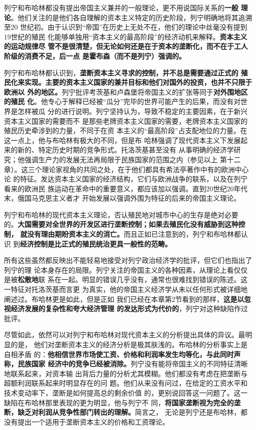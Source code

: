列宁和布哈林都没有提出帝国主义兼并的一般理论，更不用说国际关系的\textbf{一般
理论}。他们关注的是他们各自理解的资本主义特定的历史阶段，列宁明确地将其追溯至20
世纪初。由于认识到“帝国”在历史上无处不在，他们的理论中丝毫没有提到19世纪的殖民
化能够单独用“资本主义的最高阶段”的经济动机来解释。\textbf{资本主义的运动规律尽
管不是很清楚，但无论如何还是在于资本的垄断化，而不在于工人阶级的消费不足，后一点
是霍布森（而不是列宁）强调的。}

列宁和布哈林都认识到，\textbf{垄断资本主义寻求的控制，并不总是需要通过正式的
殖民化来实现。主要的资本主义国家的兼并目标和他们对国外的投资，也并不只限于欧洲以
外的地区。}列宁批评考茨基和卢森堡将帝国主义的扩张等同于\textbf{对外围地区的殖民
化}。他专心于解释已经被“瓜分”完毕的世界可能产生的后果，而没有对世界是怎样被瓜
分的进行说明。列宁坚持认为，导致不稳定的主要因素，在于新兴资本主义国家的需要而不
是那些老牌资本主义国家的需要，老牌资本主义国家的殖民历史牵涉到的力量，不同于在资
本主义的“最高阶段”占支配地位的力量。在这一点上，他与布哈林有极大的不同，但是布
哈林强调了现代资本主义下发展起来的新的、特定历史时期的竞争形式。托洛茨基甚至没有
从事明确的经济学研究；他强调生产力的发展无法再局限于民族国家的范围之内（参见以上
第十二章）。这三个理论家视角的共同之处，在于他们都具有希法亭著作中有的欧洲中心论
的特征。发达资本主义国家的经济结构，它们与欧洲战争的联系，以及在列宁看来的欧洲民
族运动在革命中的重要意义，都应该加以强调。直到20世纪20年代末，俄国马克思主义者才
开始发展以强调外围为特征的后来的帝国主义理论。

列宁和布哈林的现代资本主义理论，否认殖民地对城市中心的生存是绝对必要
的。\textbf{大国需要对全世界的开发区进行垄断控制；如果去殖民化没有威胁到这种控制，
  就没有理由期盼资本主义的消亡。}而且正如已注意到的，列宁和布哈林都认识
到\textbf{经济控制是比正式的殖民统治更具一般性的范畴。}

所有这些虽然都反映出不能轻易地接受对列宁政治经济学的批评，但它们也指出了列宁的理
论本身存在的局限。列宁关注的帝国主义的各种因素，从理论上看仅仅是被\textbf{松散地}联
系在一起。明显的错误几乎没有，通常也很难找到错误的陈述。这一特征对托洛茨基而言更
为真实，他的帝国主义经济学从未以任何形式被详细地阐述过。布哈林更是如此，但是正如
我们已经在本章第2节看到的那样，\textbf{这是以忽视经济发展的复杂性和夸大经济管理
的发达形式为代价的}，列宁对这种缺陷作过批评。

尽管如此，依然可以对列宁和布哈林对现代资本主义的分析提出具体的异议。最明显的是，
他们对垄断资本主义的经济分析是极其肤浅的。布哈林的分析事实上是自相矛盾
的：\textbf{他相信世界市场使工资、价格和利润率发生均等化，与此同时声称，民族国家
  经济中的竞争已经被消除。}列宁没有能将帝国主义的不同特征清晰地联系起来，对资本输
出背后力量的分析尤其模糊。他们都没有考虑在把垄断与超额利润联系起来时明显存在的问
题。他们从来没有问过，在给定的工资水平和技术变动率下，垄断是如何提高总的剩余价值
的，更别说回答这一问题了。这一缺陷在布哈林那里表现的更为明显，他与列宁不
同，\textbf{将国家垄断视为完全的垄断，缺乏对利润从竞争性部门转出的理解。}简言之，
无论是列宁还是布哈林，都没有提出一个适用于垄断资本主义的价格和工资理论。

